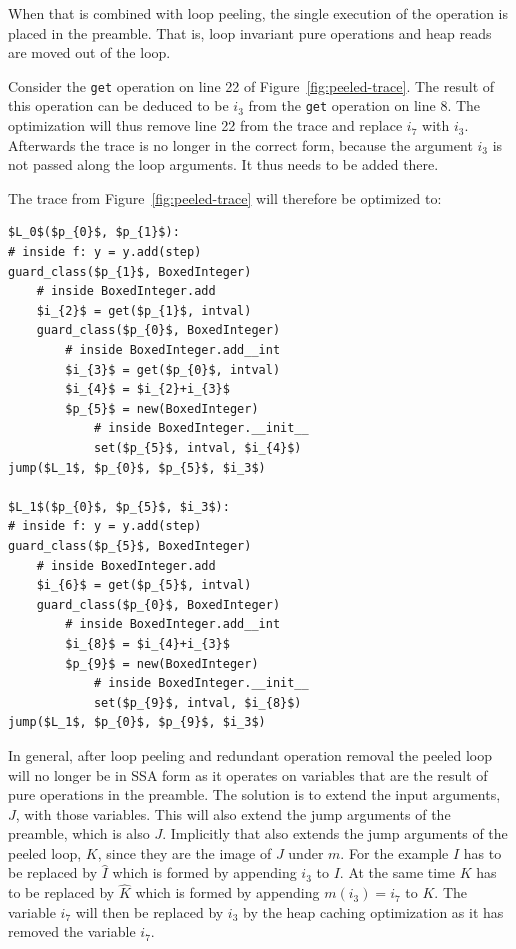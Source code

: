\documentclass[preprint]{sigplanconf}
\begin{document}
When that is combined with loop peeling, the single execution of the operation
is placed in the preamble. That is, loop invariant pure operations and heap
reads are moved out of the loop. 

Consider the \lstinline{get} operation on line 22 of
Figure~\ref{fig:peeled-trace}. The result of this operation can be
deduced to be $i_3$ from the \lstinline{get} operation on line
8. The optimization will thus remove line 22 from the trace and
replace $i_7$ with $i_3$. Afterwards the trace is no longer in the correct
form, because the argument $i_3$ is not passed along the loop arguments. It
thus needs to be added there.

The trace from Figure~\ref{fig:peeled-trace} will therefore be optimized to:

\begin{lstlisting}[mathescape,numbers = right,basicstyle=\setstretch{1.05}\ttfamily\scriptsize]
$L_0$($p_{0}$, $p_{1}$):
# inside f: y = y.add(step)
guard_class($p_{1}$, BoxedInteger)
    # inside BoxedInteger.add
    $i_{2}$ = get($p_{1}$, intval)
    guard_class($p_{0}$, BoxedInteger)
        # inside BoxedInteger.add__int
        $i_{3}$ = get($p_{0}$, intval)
        $i_{4}$ = $i_{2}+i_{3}$
        $p_{5}$ = new(BoxedInteger)
            # inside BoxedInteger.__init__
            set($p_{5}$, intval, $i_{4}$)
jump($L_1$, $p_{0}$, $p_{5}$, $i_3$)

$L_1$($p_{0}$, $p_{5}$, $i_3$):
# inside f: y = y.add(step)
guard_class($p_{5}$, BoxedInteger)
    # inside BoxedInteger.add
    $i_{6}$ = get($p_{5}$, intval)
    guard_class($p_{0}$, BoxedInteger)
        # inside BoxedInteger.add__int
        $i_{8}$ = $i_{4}+i_{3}$
        $p_{9}$ = new(BoxedInteger)
            # inside BoxedInteger.__init__
            set($p_{9}$, intval, $i_{8}$)
jump($L_1$, $p_{0}$, $p_{9}$, $i_3$)
\end{lstlisting}

In general, after loop peeling and redundant operation removal the peeled loop
will no longer be in SSA form as it operates on variables that are the result
of pure operations in the preamble. The solution is to extend the input
arguments, $J$, with those variables. This will also extend the
jump arguments of the preamble, which is also $J$. 
Implicitly that also extends the jump arguments of the peeled loop, $K$,
since they are the image of $J$ under $m$. For the example $I$ has to
be replaced by $\hat I$ which is formed by appending $i_3$ to $I$.
At the same time $K$ has to be replaced by
$\hat K$ which is formed by appending $m\left(i_3\right)=i_7$ to $K$.
The variable $i_7$ will then be replaced by $i_3$ by the heap caching
optimization as it has removed the variable $i_7$.
\end{document}
